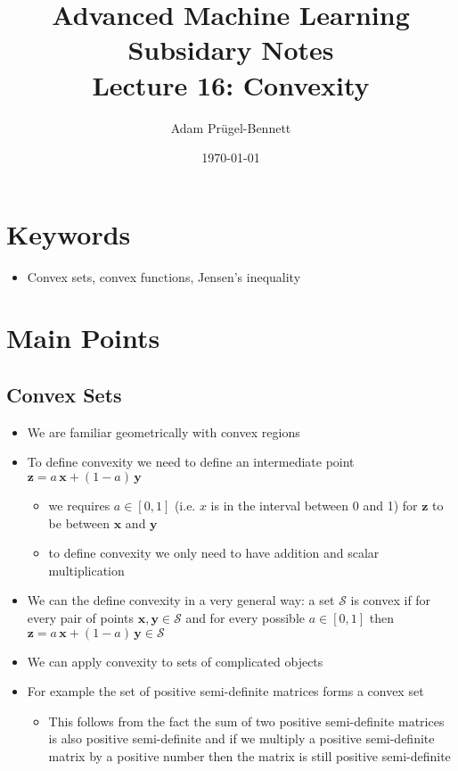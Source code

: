 \documentclass[11pt]{article}
\author{Adam Prügel-Bennett}
\date{\today}
\title{Advanced Machine Learning Subsidary Notes\\\medskip
\large Lecture 16: Convexity}
\begin{document}
\maketitle


\section{Keywords}
\label{sec:org3fe38ab}
\begin{itemize}
\item Convex sets, convex functions, Jensen's inequality
\end{itemize}

\section{Main Points}
\label{sec:org462c10c}

\subsection{Convex Sets}
\label{sec:orgbb5ea4f}
\begin{itemize}
\item We are familiar geometrically with convex regions
\item To define convexity we need to define an intermediate point
\(\bm{z} = a\,\bm{x} + (1-a)\,\bm{y}\)
\begin{itemize}
\item we requires \(a\in[0,1]\) (i.e. \(x\) is in the interval between 0 and 1)  for \(\bm{z}\) to be between \(\bm{x}\) and \(\bm{y}\)
\item to define convexity we only need to have addition and scalar multiplication
\end{itemize}
\item We can the define convexity in a very general way: a set
\(\mathcal{S}\) is convex if for every pair of points
\(\bm{x},\bm{y}\in \mathcal{S}\) and for every possible \(a\in[0,1]\) then
\(\bm{z} = a\,\bm{x} + (1-a)\,\bm{y} \in \mathcal{S}\)
\item We can apply convexity to sets of complicated objects
\item For example the set of positive semi-definite matrices forms a convex set
\begin{itemize}
\item This follows from the fact the sum of two positive
semi-definite matrices is also positive semi-definite and if we
multiply a positive semi-definite matrix by a positive number
then the matrix is still positive semi-definite
\end{itemize}
\end{itemize}
\end{document}

